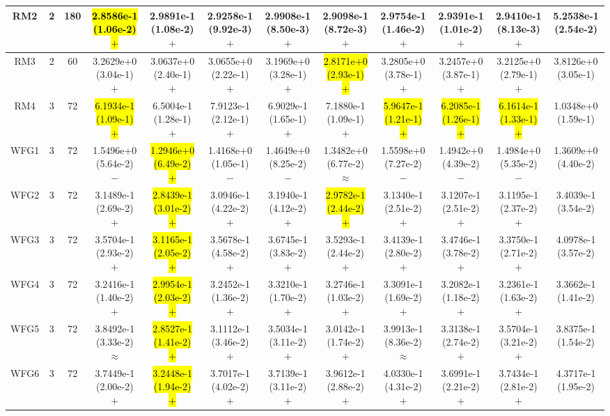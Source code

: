 \documentclass[journal]{IEEEtran}
\begin{document}
\begin{table*}[htbp]
\begin{tabular}{cccccccccccc}
\hline
\multirow{1}{*}{RM2}&2&180&\hl{2.8586e-1 (1.06e-2) $+$}&2.9891e-1 (1.08e-2) $+$&2.9258e-1 (9.92e-3) $+$&2.9908e-1 (8.50e-3) $+$&2.9098e-1 (8.72e-3) $+$&2.9754e-1 (1.46e-2) $+$&2.9391e-1 (1.01e-2) $+$&2.9410e-1 (8.13e-3) $+$&5.2538e-1 (2.54e-2)\\
\hline
\multirow{1}{*}{RM3}&2&60&3.2629e+0 (3.04e-1) $+$&3.0637e+0 (2.40e-1) $+$&3.0655e+0 (2.22e-1) $+$&3.1969e+0 (3.28e-1) $+$&\hl{2.8171e+0 (2.93e-1) $+$}&3.2805e+0 (3.78e-1) $+$&3.2457e+0 (3.87e-1) $+$&3.2125e+0 (2.79e-1) $+$&3.8126e+0 (3.05e-1)\\
\hline
\multirow{1}{*}{RM4}&3&72&\hl{6.1934e-1 (1.09e-1) $+$}&6.5004e-1 (1.28e-1) $+$&7.9123e-1 (2.12e-1) $+$&6.9029e-1 (1.65e-1) $+$&7.1880e-1 (1.09e-1) $+$&\hl{5.9647e-1 (1.21e-1) $+$}&\hl{6.2085e-1 (1.26e-1) $+$}&\hl{6.1614e-1 (1.33e-1) $+$}&1.0348e+0 (1.59e-1)\\
\hline
\multirow{1}{*}{WFG1}&3&72&1.5496e+0 (5.64e-2) $-$&\hl{1.2946e+0 (6.49e-2) $+$}&1.4168e+0 (1.05e-1) $-$&1.4649e+0 (8.25e-2) $-$&1.3482e+0 (6.77e-2) $\approx$&1.5598e+0 (7.27e-2) $-$&1.4942e+0 (4.39e-2) $-$&1.4984e+0 (5.35e-2) $-$&1.3609e+0 (4.40e-2)\\
\hline
\multirow{1}{*}{WFG2}&3&72&3.1489e-1 (2.69e-2) $+$&\hl{2.8439e-1 (3.01e-2) $+$}&3.0946e-1 (4.22e-2) $+$&3.1940e-1 (4.12e-2) $+$&\hl{2.9782e-1 (2.44e-2) $+$}&3.1340e-1 (2.51e-2) $+$&3.1207e-1 (2.51e-2) $+$&3.1195e-1 (2.37e-2) $+$&3.4039e-1 (3.54e-2)\\
\hline
\multirow{1}{*}{WFG3}&3&72&3.5704e-1 (2.93e-2) $+$&\hl{3.1165e-1 (2.05e-2) $+$}&3.5678e-1 (4.58e-2) $+$&3.6745e-1 (3.83e-2) $+$&3.5293e-1 (2.44e-2) $+$&3.4139e-1 (2.80e-2) $+$&3.4746e-1 (3.78e-2) $+$&3.3750e-1 (2.71e-2) $+$&4.0978e-1 (3.57e-2)\\
\hline
\multirow{1}{*}{WFG4}&3&72&3.2416e-1 (1.40e-2) $+$&\hl{2.9954e-1 (2.03e-2) $+$}&3.2452e-1 (1.36e-2) $+$&3.3210e-1 (1.70e-2) $+$&3.2746e-1 (1.03e-2) $+$&3.3091e-1 (1.69e-2) $+$&3.2082e-1 (1.18e-2) $+$&3.2361e-1 (1.63e-2) $+$&3.3662e-1 (1.41e-2)\\
\hline
\multirow{1}{*}{WFG5}&3&72&3.8492e-1 (3.33e-2) $\approx$&\hl{2.8527e-1 (1.41e-2) $+$}&3.1112e-1 (3.46e-2) $+$&3.5034e-1 (3.11e-2) $+$&3.0142e-1 (1.74e-2) $+$&3.9913e-1 (8.36e-2) $\approx$&3.3138e-1 (2.74e-2) $+$&3.5704e-1 (3.21e-2) $+$&3.8375e-1 (1.54e-2)\\
\hline
\multirow{1}{*}{WFG6}&3&72&3.7449e-1 (2.00e-2) $+$&\hl{3.2448e-1 (1.94e-2) $+$}&3.7017e-1 (4.02e-2) $+$&3.7139e-1 (3.11e-2) $+$&3.9612e-1 (2.88e-2) $+$&4.0330e-1 (4.31e-2) $+$&3.6991e-1 (2.21e-2) $+$&3.7434e-1 (2.81e-2) $+$&4.3717e-1 (1.95e-2)\\

\end{tabular}
\end{table*}
\end{document}
